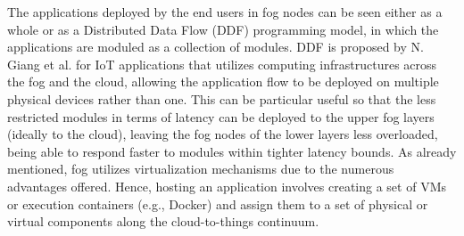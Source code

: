 \noindent\tab The applications deployed by the end users in fog nodes can be seen either as a whole or as a Distributed Data Flow (DDF) programming model, in which the applications are moduled as a collection of modules. DDF is proposed by N. Giang et al. \cite{giang2015developing} for IoT applications that utilizes computing infrastructures across the fog and the cloud, allowing the application flow to be deployed on multiple physical devices rather than one. This can be particular useful so that the less restricted modules in terms of latency can be deployed to the upper fog layers (ideally to the cloud), leaving the fog nodes of the lower layers less overloaded, being able to respond faster to modules within tighter latency bounds. As already mentioned, fog utilizes virtualization mechanisms due to the numerous advantages offered. Hence, hosting an application involves creating a set of VMs or execution containers (e.g., Docker) and assign them to a set of physical or virtual components along the cloud-to-things continuum.


